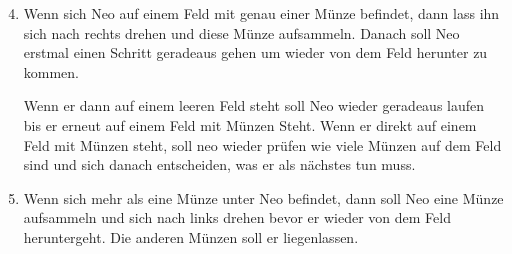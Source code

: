 \begin{enumerate}\setcounter{enumi}{3}
	\item
		Wenn sich Neo auf einem Feld mit genau einer Münze befindet, dann lass ihn sich nach rechts drehen und diese Münze aufsammeln. 
		Danach soll Neo erstmal einen Schritt geradeaus gehen um wieder von dem Feld herunter zu kommen.

		Wenn er dann auf einem leeren Feld steht soll Neo wieder geradeaus laufen bis er erneut auf einem Feld mit Münzen Steht.
		Wenn er direkt auf einem Feld mit Münzen steht, soll neo wieder prüfen wie viele Münzen auf dem Feld sind und sich danach entscheiden, was er als nächstes tun muss.

	\item
		Wenn sich mehr als eine Münze unter Neo befindet, dann soll Neo eine Münze aufsammeln und sich nach links drehen bevor er wieder von dem Feld heruntergeht.
		Die anderen Münzen soll er liegenlassen.
\end{enumerate}


